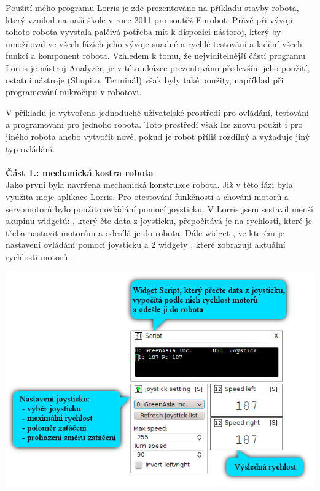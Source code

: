 \documentclass[17pt]{extreport}
\newcommand{\B}{\textbf} %
\begin{document}
Použití mého programu Lorris je zde prezentováno na příkladu stavby robota, který vznikal na naší škole v roce 2011 pro soutěž Eurobot. Právě při vývoji tohoto robota vyvstala palčivá potřeba mít k dispozici nástoroj, který by umožňoval ve všech fázích jeho vývoje snadné a rychlé testování a ladění všech funkcí a komponent robota. Vzhledem k tomu, že nejviditelnější částí programu Lorris je nástroj Analyzér, je v této ukázce prezentováno především jeho použití, ostatní nástroje (Shupito, Terminál) však byly také použity, například při programování mikročipu v robotovi.

V příkladu je vytvořeno jednoduché uživatelské prostředí pro ovládání, testování a programování pro jednoho robota. Toto prostředí však lze znovu použít i pro jiného robota anebo vytvořit nové, pokud je robot příliš rozdílný a vyžaduje jiný typ ovládání.\\
\\{\large \B{Část 1.: mechanická kostra robota}}\\
Jako první byla navržena mechanická konstrukce robota. Již v této fázi byla využita moje aplikace Lorris. Pro otestování funkčnosti a chování motorů a servomotorů bylo použito ovládání pomocí joysticku. V Lorris jsem sestavil menší skupinu widgetů: , který čte data z joysticku, přepočítává je na rychlosti, které je třeba nastavit motorům a odesílá je do robota. Dále widget , ve kterém je nastavení ovládání pomocí joysticku a 2 widgety , které zobrazují aktuální rychlosti motorů.

\vspace{40mm}
\begin{center}
\includegraphics{img/joystick2.png}
\end{center}
\end{document}
